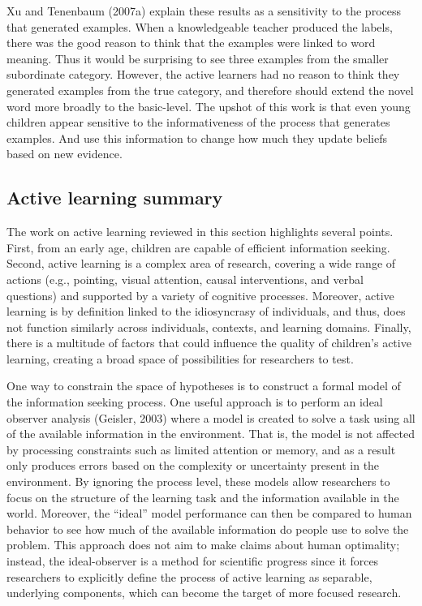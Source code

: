 \documentclass[english,floatsintext,man]{apa6}
\theoremstyle{definition}
\theoremstyle{definition}
\theoremstyle{definition}
\theoremstyle{remark}
\begin{document}
Xu and Tenenbaum (2007a) explain these results as a sensitivity to the
process that generated examples. When a knowledgeable teacher produced
the labels, there was the good reason to think that the examples were
linked to word meaning. Thus it would be surprising to see three
examples from the smaller subordinate category. However, the active
learners had no reason to think they generated examples from the true
category, and therefore should extend the novel word more broadly to the
basic-level. The upshot of this work is that even young children appear
sensitive to the informativeness of the process that generates examples.
And use this information to change how much they update beliefs based on
new evidence.

\subsection{Active learning summary}\label{active-learning-summary}

The work on active learning reviewed in this section highlights several
points. First, from an early age, children are capable of efficient
information seeking. Second, active learning is a complex area of
research, covering a wide range of actions (e.g., pointing, visual
attention, causal interventions, and verbal questions) and supported by
a variety of cognitive processes. Moreover, active learning is by
definition linked to the idiosyncrasy of individuals, and thus, does not
function similarly across individuals, contexts, and learning domains.
Finally, there is a multitude of factors that could influence the
quality of children's active learning, creating a broad space of
possibilities for researchers to test.

One way to constrain the space of hypotheses is to construct a formal
model of the information seeking process. One useful approach is to
perform an ideal observer analysis (Geisler, 2003) where a model is
created to solve a task using all of the available information in the
environment. That is, the model is not affected by processing
constraints such as limited attention or memory, and as a result only
produces errors based on the complexity or uncertainty present in the
environment. By ignoring the process level, these models allow
researchers to focus on the structure of the learning task and the
information available in the world. Moreover, the \enquote{ideal} model
performance can then be compared to human behavior to see how much of
the available information do people use to solve the problem. This
approach does not aim to make claims about human optimality; instead,
the ideal-observer is a method for scientific progress since it forces
researchers to explicitly define the process of active learning as
separable, underlying components, which can become the target of more
focused research.
\end{document}
